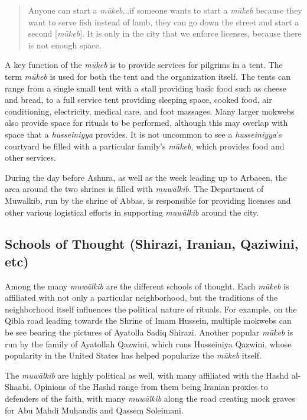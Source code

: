 \begin{quote}
    Anyone can start a \emph{mūkeb}...if someone wants to start a \emph{mūkeb} because they want to serve fish instead of lamb, they can go down the street and start a second [\emph{mūkeb}]. It is only in the city that we enforce licenses, because there is not enough space.
\end{quote}

A key function of the \emph{mūkeb} is to provide services for pilgrims in a tent. The term \emph{mūkeb} is used for both the tent and the organization itself. The tents can range from a single small tent with a stall providing basic food such as cheese and bread, to a full service tent providing sleeping space, cooked food, air conditioning, electricity, medical care, and foot massages. Many larger mokwebs also provide space for rituals to be performed, although this may overlap with space that a \emph{husseiniyya} provides. It is not uncommon to see a \emph{husseiniyya}'s courtyard be filled with a particular family's \emph{mūkeb}, which provides food and other services. 

During the day before Ashura, as well as the week leading up to Arbaeen, the area around the two shrines is filled with \emph{muwālkib}. The Department of Muwalkib, run by the shrine of Abbas, is responsible for providing licenses and other various logistical efforts in supporting \emph{muwālkib} around the city. 

\subsection{Schools of Thought (Shirazi, Iranian, Qaziwini, etc)}
Among the many \emph{muwālkib} are the different schools of thought. Each \emph{mūkeb} is affiliated with not only a particular neighborhood, but the traditions of the neighborhood itself influences the political nature of rituals. For example, on the Qibla road leading towards the Shrine of Imam Hussein, multiple mokwebs can be see bearing the pictures of Ayatolla Sadiq Shirazi. Another popular \emph{mūkeb} is run by the family of Ayatollah Qazwini, which runs Husseiniya Qazwini, whose popularity in the United States has helped popularize the \emph{mūkeb} itself. 

The \emph{muwālkib} are highly political as well, with many affiliated with the Hashd al-Shaabi. Opinions of the Hashd range from them being Iranian proxies to defenders of the faith, with many \emph{muwālkib} along the road creating mock graves for Abu Mahdi Muhandis and Qassem Soleimani. 

